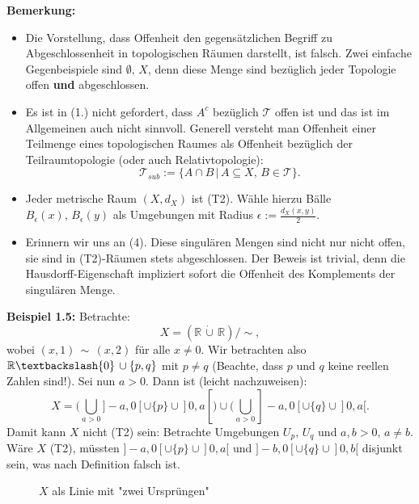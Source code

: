 \documentclass[11pt,english]{smfart}
\begin{document}
\textbf{Bemerkung:} 
\begin{itemize}
    \item Die Vorstellung, dass Offenheit den gegensätzlichen Begriff zu Abgeschlossenheit in topologischen Räumen darstellt, ist falsch. Zwei einfache Gegenbeispiele sind \(\emptyset, \, X\), denn diese Menge sind bezüglich jeder Topologie offen \textbf{und} abgeschlossen.
    \item Es ist in (1.) nicht gefordert, dass \(A^c\) bezüglich \(\mathcal{T}\) offen ist und das ist im Allgemeinen auch nicht sinnvoll. Generell versteht man Offenheit einer Teilmenge eines topologischen Raumes als Offenheit bezüglich der Teilraumtopologie (oder auch Relativtopologie):
    \begin{equation}
        \mathcal{T}_{sub} := \{A \cap B \, | \, A \subseteq X, \, B \in \mathcal{T}\}.
    \end{equation}
    \item Jeder metrische Raum \((X,d_X)\) ist (T2). Wähle hierzu Bälle \(B_{\epsilon}(x), \, B_{\epsilon}(y)\) als Umgebungen mit Radius \(\epsilon := \frac{d_X(x,y)}{2}\).
    \item Erinnern wir uns an (4). Diese singulären Mengen sind nicht nur nicht offen, sie sind in (T2)-Räumen stets abgeschlossen. Der Beweis ist trivial, denn die Hausdorff-Eigenschaft impliziert sofort die Offenheit des Komplements der singulären Menge.\\
\end{itemize}

\textbf{Beispiel 1.5:} Betrachte:
\begin{equation}
    X = (\mathbb{R} \, \dot{\cup} \, \mathbb{R}) / \sim,
\end{equation}
wobei \((x,1) \, \sim \, (x,2)\) für alle \(x \neq 0\). Wir betrachten also \(\mathbb{R} \textbackslash \{0\} \, \cup \{p,q\}\) mit \(p \neq q\) (Beachte, dass \(p\) und \(q\) keine reellen Zahlen sind!). Sei nun \(a > 0\). Dann ist (leicht nachzuweisen):
\begin{equation}
    X = (\bigcup_{a > 0} ]-a,0[ \cup \{p\} \cup ]0,a[) \cup (\bigcup_{a > 0} ]-a,0[ \cup \{q\} \cup ]0,a[.
\end{equation}
Damit kann \(X\) nicht (T2) sein: Betrachte Umgebungen \(U_p, \, U_q\) und \(a,b > 0, \, a \neq b\). Wäre \(X\) (T2), müssten \(]-a,0[ \cup \{p\} \cup ]0,a[\) und \(]-b,0[ \cup \{q\} \cup ]0,b[\) disjunkt sein, was nach Definition falsch ist.
\begin{figure}[ht!]
    \centering
{}
    \caption{\(X\) als Linie mit "zwei Ursprüngen"}
    \label{fig:linetwoorg}
\end{figure}
\end{document}
